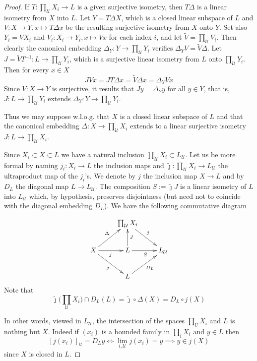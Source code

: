 \documentclass[11pt]{amsart}
\theoremstyle{plain}
\theoremstyle{remark}
\newcommand{\U}{\mathcal U}
\begin{document}
\begin{proof}%
If $T: \prod_\U X_i\to L$ is a given surjective isometry, then $T\Delta$ is a linear isometry from $X$ into $L$. Let $Y=T\Delta X$, which is a closed linear subspace of $L$ and $V: X\to Y, x\mapsto T\Delta x$ be the resulting surjective isometry from $X$ onto $Y$. Set also $Y_i=VX_i$ and $V_i: X_i\to Y_i, x\mapsto V x$ for each index $i$, and let $\widetilde V=\prod_\U V_i$. Then clearly the canonical embedding $\Delta_Y: Y\to \prod_\U Y_i$ verifies $\Delta_Y V={\widetilde V} \Delta$. Let $J\!=\! \widetilde{V}T^{-1}\!: L\to\prod_\U Y_i$, which is a surjective linear isometry from $L$ onto $\prod_\U Y_i$.
Then for every $x\in X$
\[JVx=JT\Delta x= \widetilde{V}\Delta x = \Delta_Y Vx\]
Since $V:X\to Y$ is surjective, it results that $Jy=\Delta_Y y$ for all $y\in Y$, that is, $J:L\to \prod_\U Y_i$ extends $\Delta_Y: Y\to \prod_\U Y_i$.
 
Thus we may suppose w.l.o.g. that $X$ is a closed linear subspace of $L$ and that the canonical embedding $\Delta: X\to \prod_\U X_i$  extends to a linear surjective isometry $J: L\to \prod_\U X_i$.

Since $X_i\subset X\subset L$ we have a natural inclusion $\prod_\U X_i\subset L_\U$. Let us be more formal by naming $j_i:X_i\to L$ the inclusion maps and $\tilde\jmath: \prod_\U X_i\to L_\U$ the ultraproduct map of the $j_i$'s. We denote by $j$ the inclusion map $X\to L$ and by $D_L$ the diagonal map $L\to L_\U$. The composition $S:=\tilde\jmath J$ is a linear isometry of $L$ into $L_\U$ which, by hypothesis, preserves disjointness (but need not to coincide with the diagonal embedding $D_L$).  We have the following commutative diagram

\[\xymatrix{&\prod_\U X_i\ar^{\tilde\jmath}[dr]&\\X\ar^{\Delta}[ur]\ar_{j}[r]\ar_j[rd]& L \ar_J[u]\ar_S[r]&L_\U\\&L\ar_{D_L}[ru]&}\]
Note that
\begin{equation}
\tilde\jmath\big(\prod_\U X_i\big) \cap D_L(L)= \tilde\jmath\circ \Delta(X)=D_L\circ j(X)\label{intersection}
\end{equation}

In other words, viewed in $L_\U$, the intersection of the spaces $\prod_UX_i$ and $L$ is nothing but  $X$. Indeed if $(x_i)$ is a bounded family in $\prod_i X_i$ and $y\in L$ then
\[ [j(x_i)]_\U = D_L y \iff \lim_{i,\U} j(x_i)= y \implies y\in j(X) \]
since $X$ is closed in $L$.


\end{proof}
\end{document}
